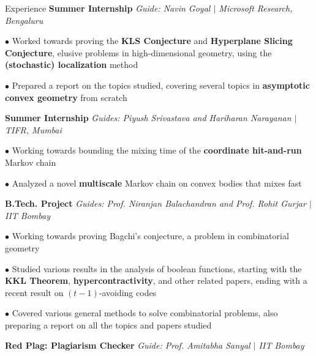 \begin{rubric}{Experience}
    \entry*[2021] \textbf{Summer Internship} \hfill \emph{Guide: Navin Goyal $\mid$ Microsoft Research, Bengaluru}
        
        $\bullet$ Worked towards proving the \textbf{KLS Conjecture} and \textbf{Hyperplane Slicing Conjecture}, elusive problems in high-dimensional geometry, using the \textbf{(stochastic) localization} method

        $\bullet$ Prepared a report on the topics studied, covering several topics in \textbf{asymptotic convex geometry} from scratch

    \entry*[2022] \textbf{Summer Internship} \hfill \emph{Guides: Piyush Srivastava and Hariharan Narayanan $\mid$ TIFR, Mumbai}

        $\bullet$ Working towards bounding the mixing time of the \textbf{coordinate hit-and-run} Markov chain

        $\bullet$ Analyzed a novel \textbf{multiscale} Markov chain on convex bodies that mixes fast

    \entry*[\phantom{.}2022] \textbf{B.Tech. Project} \hfill \emph{Guides: Prof. Niranjan Balachandran and Prof. Rohit Gurjar $\mid$ IIT Bombay}

        $\bullet$ Working towards proving Bagchi's conjecture, a problem in combinatorial geometry

        $\bullet$ Studied various results in the analysis of boolean functions, starting with the \textbf{KKL Theorem}, \textbf{hypercontractivity}, and other related papers, ending with a recent result on $(t-1)$-avoiding codes

        $\bullet$ Covered various general methods to solve combinatorial problems, also preparing a report on all the topics and papers studied




    \entry*[2020] \textbf{Red Plag: Plagiarism Checker} \hfill \emph{Guide: Prof. Amitabha Sanyal $\mid$ IIT Bombay}
	    

\end{rubric}
